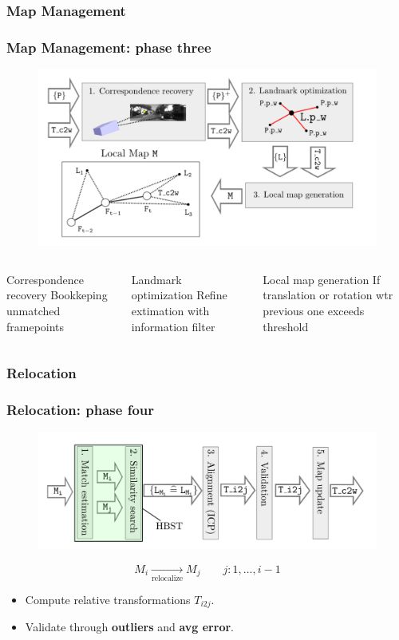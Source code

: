 \documentclass[16pt]{beamer}
\begin{document}
\subsubsection*{Map Management}
\begin{frame}
  \frametitle{Map Management: phase three}
 \begin{figure}
    \centering
    \includegraphics[width=.8\textwidth]{slam3}
  \end{figure}
  \begin{columns}
    \begin{block}{Correspondence recovery}
      Bookkeping unmatched framepoints
    \end{block}
    \begin{block}{Landmark optimization}
      Refine extimation with information filter
    \end{block}
    \begin{block}{Local map generation}
      If translation or rotation wtr previous one exceeds threshold    
    \end{block}
  \end{columns}
\end{frame}


\subsubsection*{Relocation}
\begin{frame}
  \frametitle{Relocation: phase four}
  \begin{figure}
    \centering
    \includegraphics[width=.8\textwidth]{slam1}
  \end{figure}
  \begin{equation}
    M_i \xrightarrow[\text{relocalize}]{} M_j \qquad j: 1, \dots, i-1
  \end{equation}
  \smallskip
  \begin{itemize}
  \item{Compute relative transformations $T_{i2j}$.}
  \item{Validate through \textbf{outliers} and \textbf{avg error}.}
  \end{itemize}
\end{frame}
\end{document}
